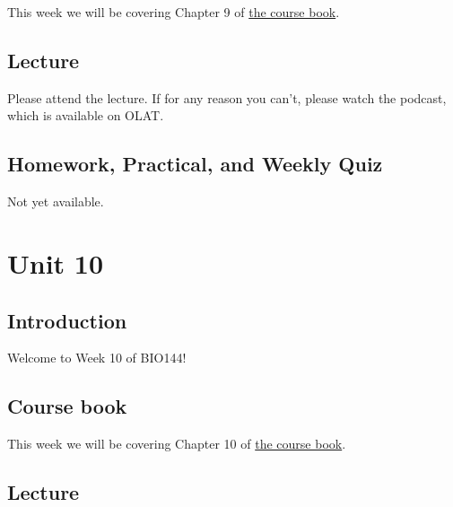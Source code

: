 \documentclass[
  letterpaper,
  8pt,
  a4paper]{book}
\begin{document}

This week we will be covering Chapter 9 of
\href{https://opetchey.github.io/BIO144_Course_Book/}{the course book}.

\section*{Lecture}\label{lecture-8}


Please attend the lecture. If for any reason you can't, please watch the
podcast, which is available on OLAT.

\section*{Homework, Practical, and Weekly
Quiz}\label{homework-practical-and-weekly-quiz-8}


Not yet available.


\chapter*{Unit 10}\label{unit-10}


\section*{Introduction}\label{introduction-10}


Welcome to Week 10 of BIO144!

\section*{Course book}\label{course-book-9}


This week we will be covering Chapter 10 of
\href{https://opetchey.github.io/BIO144_Course_Book/}{the course book}.

\section*{Lecture}\label{lecture-9}
\end{document}

